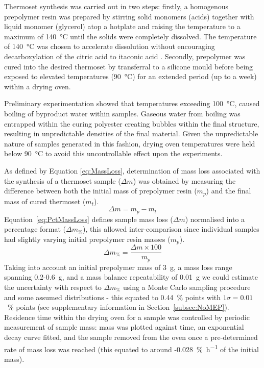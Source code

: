 Thermoset synthesis was carried out in two steps: firstly, a homogenous 
 prepolymer resin was prepared by stirring solid monomers (acids) together 
 with liquid monomer
 (glycerol) atop a hotplate and raising the temperature to a maximum of 
 140~\unit{\degreeCelsius} until the solids were completely dissolved.
The temperature of 140~\unit{\degreeCelsius} was chosen to accelerate dissolution
 without encouraging decarboxylation of the citric acid to itaconic
 acid \autocite{Alberts2017}.
Secondly, prepolymer was cured into the desired thermoset by transferral to
 a silicone mould before being exposed to elevated temperatures
 (90~\unit{\degreeCelsius}) for an extended period (up to a week) within
 a drying oven.

Preliminary experimentation showed that temperatures exceeding
 100~\unit{\degreeCelsius}, caused boiling of byproduct water within samples.
Gaseous water from boiling was entrapped within the curing polyester creating
 bubbles within the final structure, resulting in unpredictable densities
 of the final material.
Given the unpredictable nature of samples generated in this 
 fashion, drying oven temperatures were held below 90~\unit{\degreeCelsius}
 to avoid this uncontrollable effect upon the experiments.

As defined by Equation \ref{eq:MassLoss}, determination of mass loss
 associated with the synthesis of a thermoset sample (\(\Delta m\)) was
 obtained by measuring the difference between both the initial mass of
 prepolymer resin (\(m_{p}\)) and the final mass of cured thermoset
 (\(m_{t}\)).
\begin{equation}\label{eq:MassLoss}
    \Delta m=m_{p}-m_{t}
\end{equation}
Equation~\ref{eq:PctMassLoss} defines sample mass loss (\(\Delta m\))
 normalised into a percentage format (\(\Delta m_{\%}\)), this allowed
 inter-comparison since individual samples had slightly varying initial
 prepolymer resin masses (\(m_{p}\)).
\begin{equation}\label{eq:PctMassLoss}
    \Delta m_{\%}=\frac{\Delta m\times 100}{m_{p}}
\end{equation}
Taking into account an initial prepolymer mass 
 of 3~\unit{\gram}, a mass loss range spanning 0.2-0.6~\unit{\gram}, 
 and a mass balance repeatability of 0.01~\unit{\gram} we could 
 estimate the uncertainty with respect to \(\Delta m_{\%}\) using 
 a Monte Carlo sampling procedure and some assumed distributions - 
 this equated to 0.44~\% points with \(1\sigma=0.01\)~\% points 
 (see supplementary information in Section~\ref{subsec:NoMEP}).
Residence time within the drying oven for a sample was controlled by
 periodic measurement of sample mass: mass was plotted against time, an
 exponential decay curve fitted, and the sample removed from the oven once
 a pre-determined rate of mass loss was reached (this equated to around
 -0.028~\unit{\percent\per\hour} of the initial mass).

